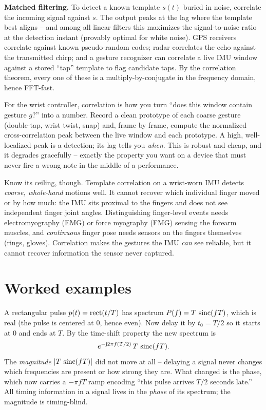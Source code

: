 \begin{applicationbox}
\textbf{Matched filtering.} To detect a known template $s(t)$ buried in noise,
correlate the incoming signal against $s$. The output peaks at the lag where the
template best aligns -- and among all linear filters this maximizes the
signal-to-noise ratio at the detection instant (provably optimal for white
noise). GPS receivers correlate against known pseudo-random codes; radar
correlates the echo against the transmitted chirp; and a gesture recognizer can
correlate a live IMU window against a stored ``tap'' template to flag candidate
taps. By the correlation theorem, every one of these is a multiply-by-conjugate
in the frequency domain, hence FFT-fast.
\end{applicationbox}

\begin{goalbox}
For the wrist controller, correlation is how you turn ``does this window contain
gesture $g$?'' into a number. Record a clean prototype of each coarse gesture
(double-tap, wrist twist, snap) and, frame by frame, compute the normalized
cross-correlation peak between the live window and each prototype. A high,
well-localized peak is a detection; its lag tells you \emph{when}. This is robust
and cheap, and it degrades gracefully -- exactly the property you want on a
device that must never fire a wrong note in the middle of a performance.

Know its ceiling, though. Template correlation on a wrist-worn IMU
detects \emph{coarse, whole-hand} motions well. It cannot recover which
individual finger moved or by how much: the IMU sits proximal to the fingers and
does not see independent finger joint angles. Distinguishing finger-level
events needs electromyography (EMG) or force myography (FMG) sensing the
forearm muscles, and \emph{continuous} finger pose needs sensors on the fingers
themselves (rings, gloves). Correlation makes the gestures the IMU \emph{can} see
reliable, but it cannot recover information the sensor never captured.
\end{goalbox}

\section{Worked examples}
\label{ch11:worked}

\begin{example}
\label{ch11:ex-delay}
A rectangular pulse $p(t) = \operatorname{rect}(t/T)$ has spectrum $P(f) = T\,\operatorname{sinc}(fT)$,
which is real (the pulse is centered at $0$, hence even). Now delay it by
$t_0 = T/2$ so it starts at $0$ and ends at $T$. By the time-shift property the
new spectrum is
\[
e^{-\mathrm{j} 2\pi f (T/2)}\, T\,\operatorname{sinc}(fT).
\]
The \emph{magnitude} $\lvert T\,\operatorname{sinc}(fT)\rvert$ did not move at all -- delaying a
signal never changes which frequencies are present or how strong they are. What
changed is the phase, which now carries a $-\pi f T$ ramp encoding ``this pulse
arrives $T/2$ seconds late.'' All timing information in a signal lives in the
\emph{phase} of its spectrum; the magnitude is timing-blind.
\end{example}

